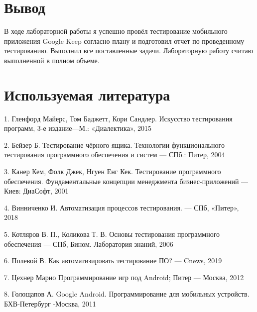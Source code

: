 \documentclass[12pt]{article}
\begin{document}
    \section*{Вывод}

    В ходе лабораторной работы я успешно провёл тестирование мобильного приложения Google Keep согласно плану и подготовил отчет по проведенному тестированию. Выполнил все поставленные задачи. Лабораторную работу считаю выполненной в полном объеме.

    \section*{Используемая литература}

    1. Гленфорд Майерс, Том Баджетт, Кори Сандлер. Искусство тестирования программ, 3-е издание—М.: «Диалектика», 2015

    2. Бейзер Б. Тестирование чёрного ящика. Технологии функционального тестирования программного обеспечения и систем --- СПб.: Питер, 2004

    3. Канер Кем, Фолк Джек, Нгуен Енг Кек. Тестирование программного обеспечения. Фундаментальные концепции менеджмента бизнес-приложений --- Киев: ДиаСофт, 2001

    4. Винниченко И. Автоматизация процессов тестирования. --- СПб, «Питер», 2018

    5. Котляров В. П., Коликова Т. В. Основы тестирования программного обеспечения --- СПб, Бином. Лаборатория знаний, 2006

    6. Полевой В. Как автоматизировать тестирование ПО? --- Cnews, 2019

    7. Цехнер Марио Программирование игр под Android; Питер --- Москва, 2012

    8. Голощапов А. Google Android. Программирование для мобильных устройств. БХВ-Петербург -Москва, 2011
\end{document}

